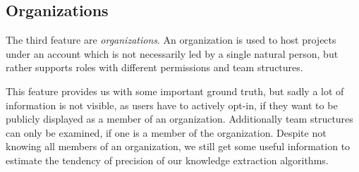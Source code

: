 \subsection{Organizations}\label{github-organization}
The third feature are \emph{organizations}.
An organization is used to host projects under an account which is not necessarily led by a single natural person, but rather supports roles with different permissions and team structures.

This feature provides us with some important ground truth, but sadly a lot of information is not visible, as users have to actively opt-in, if they want to be publicly displayed as a member of an organization.
Additionally team structures can only be examined, if one is a member of the organization.
Despite not knowing all members of an organization, we still get some useful information to estimate the tendency of precision of our knowledge extraction algorithms.
